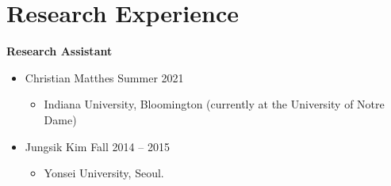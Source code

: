\documentclass[11pt,a4paper]{article}
\begin{document}
\section*{Research Experience}
\textbf{Research Assistant} 
\begin{itemize}[leftmargin=*]
    \item Christian Matthes \hfill Summer 2021
    \begin{itemize}
        \item Indiana University, Bloomington (currently at the University of Notre Dame)    
    \end{itemize}
    \item Jungsik Kim \hfill Fall 2014 -- 2015
    \begin{itemize}
        \item Yonsei University, Seoul.       
    \end{itemize}    
\end{itemize}
\end{document}
